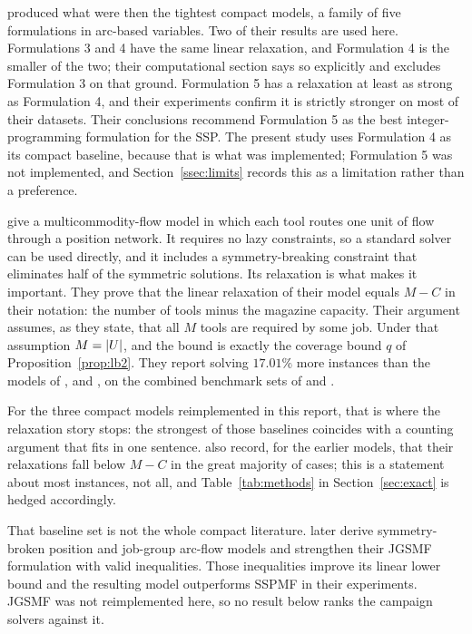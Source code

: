 \citet{Catanzaro2015} produced what were then the tightest compact models, a family of five
formulations in arc-based variables. Two of their results are used here. Formulations
3 and 4 have the same linear relaxation, and Formulation 4 is the smaller of the two;
their computational section says so explicitly and excludes Formulation 3 on that
ground. Formulation 5 has a relaxation at least as strong as Formulation 4, and their
experiments confirm it is strictly stronger on most of their datasets. Their
conclusions recommend Formulation 5 as the best integer-programming formulation for
the SSP. The present study uses Formulation 4 as its compact baseline, because that
is what was implemented; Formulation 5 was not implemented, and
Section~\ref{ssec:limits} records this as a limitation rather than a preference.

\citet{daSilva2024} give a multicommodity-flow model in which each tool routes one
unit of flow through a position network. It requires no lazy constraints, so a
standard solver can be used directly, and it includes a symmetry-breaking constraint
that eliminates half of the symmetric solutions. Its relaxation is what makes it
important. They prove that the linear relaxation of their model equals $M-C$ in
their notation: the number of tools minus the magazine capacity. Their argument
assumes, as they state, that all $M$ tools are required by some job. Under that
assumption $M=\lvert U\rvert$, and the bound is exactly the coverage bound $q$ of
Proposition~\ref{prop:lb2}. They report solving $17.01\%$ more instances than the
models of \citet{Tang1988}, \citet{Laporte2004} and \citet{Catanzaro2015}, on the
combined benchmark sets of \citet{Yanasse2009} and \citet{Catanzaro2015}.

For the three compact models reimplemented in this report, that is where the relaxation
story stops: the strongest of those baselines coincides with a counting argument that
fits in one sentence. \citet{daSilva2024}
also record, for the earlier models, that their relaxations fall below $M-C$ in the
great majority of cases; this is a statement about most instances, not all, and
Table~\ref{tab:methods} in Section~\ref{sec:exact} is hedged accordingly.

That baseline set is not the whole compact literature. \citet{Akhundov2024} later
derive symmetry-broken position and job-group arc-flow models and strengthen their
JGSMF formulation with valid inequalities. Those inequalities improve its linear
lower bound and the resulting model outperforms SSPMF in their experiments. JGSMF was
not reimplemented here, so no result below ranks the campaign solvers against it.

